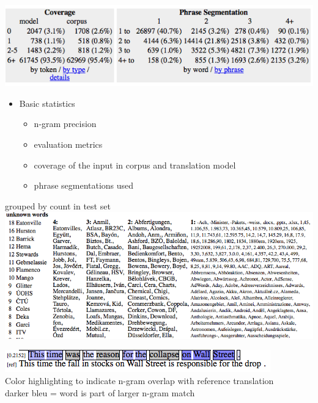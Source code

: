 \documentclass[landscape]{uedslides2C}
\begin{document}

\begin{center}
\includegraphics[scale=1]{analysis-stats.png}
\end{center}
\begin{itemize}
\item Basic statistics
\begin{itemize}
\item n-gram precision
\item evaluation metrics
\item coverage of the input in corpus and translation model
\item phrase segmentations used
\end{itemize}
\end{itemize}


\begin{center}
grouped by count in test set\\[5mm]
\includegraphics[scale=1]{analysis-unknown.png}
\end{center}


\vspace{30mm}
\begin{center}
\includegraphics[scale=1.5]{analysis-bleu.png}\\[20mm]
Color highlighting to indicate n-gram overlap with reference translation\\[5mm]
darker bleu = word is part of larger n-gram match
\end{center}
\end{document}
